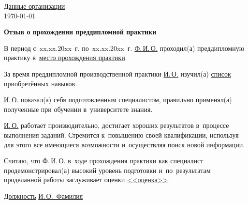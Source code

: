 \documentclass[paper=a4, fontsize=14pt, DIV=calc, oneside]{scrartcl}
\begin{document}
    \begin{flushright}
        \begin{minipage}{0.5\textwidth}
            \raggedleft
            \underline{Данные организации}\\
            \today
        \end{minipage}
    \end{flushright}

    \begin{center}
        \textbf{Отзыв о прохождении преддипломной практики}
    \end{center}

    В период с~xx.xx.20xx~г. по~xx.xx.20xx~г. \underline{Ф.\,И.\,О.} проходил(а)
    преддипломную практику в~\underline{место прохождения практики}.

    За время преддипломной производственной практики \underline{И.\,О.} изучил(а)
    \underline{список приобретённых навыков}.

    \underline{И.\,О.} показал(а) себя подготовленным специалистом, правильно
    применял(а) полученные при обучении в~университете знания.

    \underline{И.\,О.} работает производительно, достигает хороших результатов
    в~процессе выполнения заданий. Стремится к~повышению своей квалификации,
    используя для этого все имеющиеся возможности и~осуществляя поиск новой
    информации.

    Считаю, что \underline{Ф.\,И.\,О.} в~ходе прохождения практики как специалист
    продемонстрировал(а) высокий уровень подготовки и~по~результатам проделанной
    работы заслуживает оценки \underline{<<оценка>>}.

    \vspace{2cm}
    \noindent\underline{Должность} \hfill \underline{\hspace{4cm}} \hfill \underline{И.\,О.~Фамилия}
\end{document}
